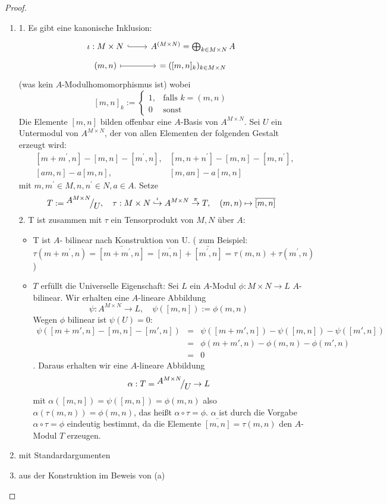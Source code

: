 \begin{proof} 
	\begin{enumerate} [label= \alph*)]
		\item 1. Es gibt eine kanonische Inklusion:
		$$\begin{tikzcd}[row sep = tiny]
			\iota: M \times N\arrow[hook]{r} & A^{(M \times N)} = \bigoplus_{k\in M \times N} A	\\
			(m,n) \arrow[mapsto]{r} & [m,n] = ([m,n]_k)_{k\in M\times N}	
		\end{tikzcd}$$
		(was kein $A$-Modulhomomorphismus ist) wobei 
		$$[m,n]_k:= \begin{cases}
		1, & \text{falls } k=(m,n) \\0 & \text{sonst}
		\end{cases}$$
		Die Elemente $[m,n] $ bilden offenbar eine $A$-Basis von $A^{M \times N } $. Sei $U$ ein Untermodul von $A^{M \times N }$, der von allen Elementen der folgenden Gestalt erzeugt wird: 
		\begin{align*}
		 &[m + m^{'}, n] - [m,n] - [m^{'}, n], &[m, n + n^{'}] - [m,n] -[m,n^{'}], \\
		 &[am,n] -a[m,n],& [m,an] -a[m,n]
		\end{align*} mit $m,m^{'} \in M, n,n^{'} \in N, a\in A.$ Setze $$T:= \QR{A^{M \times N}}{U}, \quad \tau: M \times N \overset{\iota}{\hookrightarrow} A^{M \times N} \overset{\pi}{\to} T,\quad  (m,n) \mapsto \bar{[m,n]}$$ 
		2. T ist zusammen mit $\tau$ ein Tensorprodukt von $M,N$ über $A$: 
		\begin{itemize}
			\item T ist $A$- bilinear nach Konstruktion von U. ( zum Beispiel: $\tau(m +m^{'},n) = \bar{[m +m^{'},n]} = \bar{[m,n]} + \bar{[m^{'},n]} = \tau(m,n) + \tau(m^{'},n)$)
			\item $T$ erfüllt die Universelle Eigenschaft: Sei $L$ ein $A$-Modul $\phi: M \times N \to L $ $A$-bilinear. Wir erhalten eine $A$-lineare Abbildung $$\psi: A^{M \times N } \to L, \quad \psi([m,n]) := \phi(m,n)$$ Wegen $\phi$ bilinear ist $\psi(U) = 0:$
			\begin{eqnarray*} \psi( [m + m', n] - [m,n] - [m', n]) &=& \psi([m + m', n]) -\psi([m,n]) - \psi([m', n])\\
				& =& \phi(m + m', n) -\phi(m,n) -\phi(m', n) \\
				&=& 0
			 \end{eqnarray*}. Daraus erhalten wir eine $A$-lineare Abbildung $$ \alpha: T = \QR{A^{M \times N}}{U} \to L $$ mit $\alpha([m,n]) = \psi([m,n]) = \phi(m,n)$ also $\alpha(\tau(m,n)) = \phi(m,n)$, das heißt $\alpha \circ \tau = \phi $. $\alpha $ ist durch die Vorgabe $\alpha \circ \tau = \phi $ eindeutig bestimmt, da die Elemente $ \bar{[m,n]} = \tau(m,n) $ den $A$-Modul $T$ erzeugen. 
		\end{itemize}
		\item mit Standardargumenten 
		\item aus der Konstruktion im Beweis von (a)
	\end{enumerate}
\end{proof}
